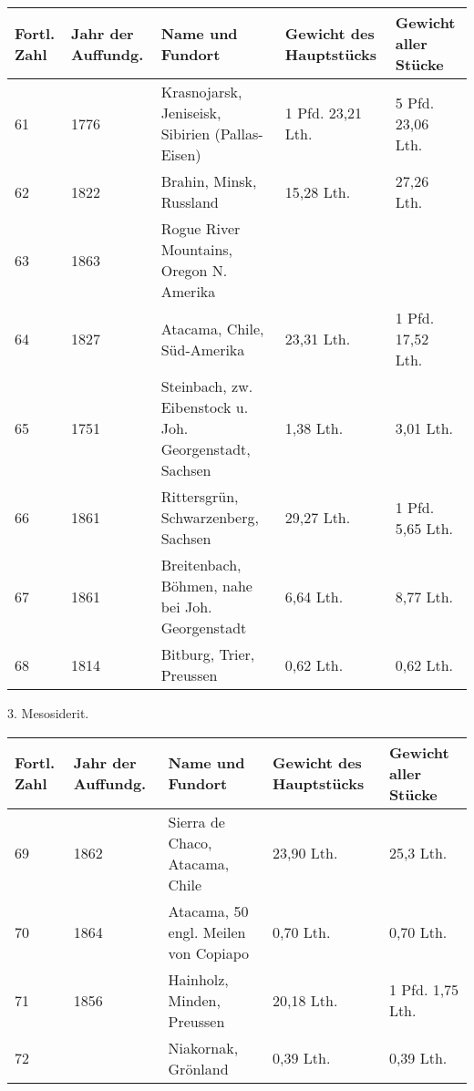 \documentclass[a4paper, 11pt, oneside]{article}
\begin{document}
\begin{center}
\begin{footnotesize}
\begin{tabular}{ |p{7mm}|p{9mm}|p{55mm}|p{24mm}|p{24mm}| }
    \hline
    Fortl. Zahl & Jahr der Auffundg. & Name und Fundort & Gewicht des Hauptstücks & Gewicht aller Stücke\\
    \hline\hline
    61 & 1776 & Krasnojarsk, Jeniseisk, Sibirien (Pallas-Eisen) & 1 Pfd. 23,21 Lth. & 5 Pfd. 23,06 Lth.\\\hline
    62 & 1822 & Brahin, Minsk, Russland & 15,28 Lth. & 27,26 Lth.\\\hline
    63 & 1863 & Rogue River Mountains, Oregon N. Amerika &  & \\\hline
    64 & 1827 & Atacama, Chile, Süd-Amerika & 23,31 Lth. & 1 Pfd. 17,52 Lth.\\\hline
    65 & 1751 & Steinbach, zw. Eibenstock u. Joh. Georgenstadt, Sachsen & 1,38 Lth. & 3,01 Lth.\\\hline
    66 & 1861 & Rittersgrün, Schwarzenberg, Sachsen & 29,27 Lth. & 1 Pfd. 5,65 Lth.\\\hline
    67 & 1861 & Breitenbach, Böhmen, nahe bei Joh. Georgenstadt & 6,64 Lth. & 8,77 Lth.\\\hline
    68 & 1814 & Bitburg, Trier, Preussen & 0,62 Lth. & 0,62 Lth.\\
    \hline
\end{tabular}
\end{footnotesize}
\end{center}
\begin{center}
3. Mesosiderit.
\end{center}
\begin{center}
\begin{footnotesize}
\begin{tabular}{ |p{7mm}|p{9mm}|p{55mm}|p{24mm}|p{24mm}| }
    \hline
    Fortl. Zahl & Jahr der Auffundg. & Name und Fundort & Gewicht des Hauptstücks & Gewicht aller Stücke\\
    \hline\hline
    69 & 1862 & Sierra de Chaco, Atacama, Chile & 23,90 Lth. & 25,3 Lth.\\\hline
    70 & 1864 & Atacama, 50 engl. Meilen von Copiapo & 0,70 Lth. & 0,70 Lth.\\\hline
    71 & 1856 & Hainholz, Minden, Preussen & 20,18 Lth. & 1 Pfd. 1,75 Lth.\\\hline
    72 &  & Niakornak, Grönland & 0,39 Lth. & 0,39 Lth.\\
    \hline
\end{tabular}
\end{footnotesize}
\end{center}
\end{document}
